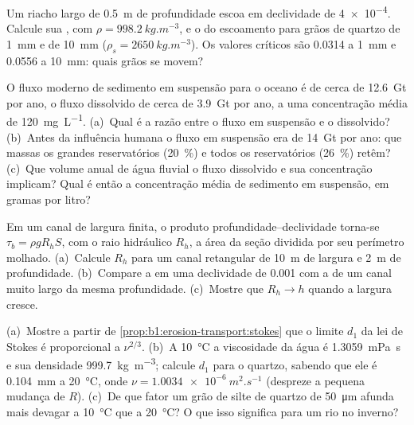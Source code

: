 \begin{exercise}[$\star$]\label{exo:b1:erosion-transport:3}
Um riacho largo de \qty{0.5}{m} de profundidade escoa em declividade de \num{4e-4}. Calcule sua , com $\rho = \qty{998.2}{kg.m^{-3}}$, e o  do escoamento para grãos de quartzo de \qty{1}{mm} e de \qty{10}{mm} ($\rho_s = \qty{2650}{kg.m^{-3}}$). Os valores críticos são \num{0.0314} a \qty{1}{mm} e \num{0.0556} a \qty{10}{mm}: quais grãos se movem?
\end{exercise}

\begin{exercise}[$\star$]\label{exo:b1:erosion-transport:4}
O fluxo moderno de sedimento em suspensão para o oceano é de cerca de \qty{12.6}{Gt} por ano, o fluxo dissolvido de cerca de \qty{3.9}{Gt} por ano, a uma concentração média de \qty{120}{mg.L^{-1}}. (a)~Qual é a razão entre o fluxo em suspensão e o dissolvido? (b)~Antes da influência humana o fluxo em suspensão era de \qty{14}{Gt} por ano: que massas os grandes reservatórios (\qty{20}{\percent}) e todos os reservatórios (\qty{26}{\percent}) retêm? (c)~Que volume anual de água fluvial o fluxo dissolvido e sua concentração implicam? Qual é então a concentração média de sedimento em suspensão, em gramas por litro?
\end{exercise}

\begin{exercise}[$\star\star$]\label{exo:b1:erosion-transport:5}
Em um canal de largura finita, o produto profundidade--declividade torna-se $\tau_b =
\rho g R_h S$, com o raio hidráulico $R_h$, a área da seção dividida por seu perímetro molhado. (a)~Calcule $R_h$ para um canal retangular de \qty{10}{m} de largura e \qty{2}{m} de profundidade. (b)~Compare a  em uma declividade de \num{0.001} com a de um canal muito largo da mesma profundidade. (c)~Mostre que $R_h \to h$ quando a largura cresce.
\end{exercise}

\begin{exercise}[$\star\star$]\label{exo:b1:erosion-transport:6}
(a)~Mostre a partir de \cref{prop:b1:erosion-transport:stokes} que o limite $d_1$ da lei de Stokes é proporcional a $\nu^{2/3}$. (b)~A \qty{10}{\celsius} a viscosidade da água é \qty{1.3059}{mPa.s} e sua densidade \qty{999.7}{kg.m^{-3}}; calcule $d_1$ para o quartzo, sabendo que ele é \qty{0.104}{mm} a \qty{20}{\celsius}, onde $\nu = \qty{1.0034e-6}{m^2.s^{-1}}$ (despreze a pequena mudança de $R$). (c)~De que fator um grão de silte de quartzo de \qty{50}{\micro m} afunda mais devagar a \qty{10}{\celsius} que a \qty{20}{\celsius}? O que isso significa para um rio no inverno?
\end{exercise}

